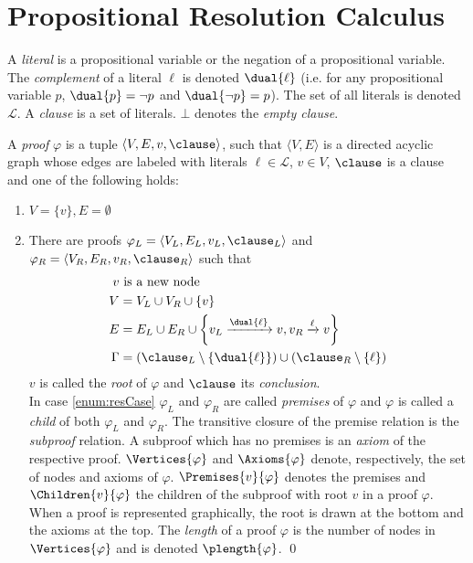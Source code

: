 \section{Propositional Resolution Calculus}
\label{sec:Resolution}

A \emph{literal} is a propositional variable or the negation of a propositional variable. The
\emph{complement} of a literal $\ell$ is denoted $\dual{\ell}$ (i.e. for any propositional variable $p$,
$\dual{p} = \neg p$ and $\dual{\neg p} = p$). The set of all literals is denoted $\mathcal{L}$. A
\emph{clause} is a set of literals. $\bot$ denotes the \emph{empty clause}.


\newcommand{\axiom}[1]{\widehat{#1}}
\newcommand{\n}{v}
\newcommand{\raiz}[1]{\rho(#1)}

\begin{definition}[Proof] 
\label{def:proof}
A \emph{proof} $\varphi$ is a tuple $\langle V,E,\n,\clause \rangle$, 
such that $\langle V,E \rangle$ is a directed acyclic graph whose edges are labeled with literals $\ell \in \mathcal{L}$, $\n \in V$, $\clause$ is a clause 
and one of the following holds:

\begin{enumerate}
	\item $V = \{\n\}, E = \emptyset$
	\item \label{enum:resCase} There are proofs $\varphi_L = \langle V_L, E_L, \n_L,\clause_L \rangle$ and $\varphi_R = \langle V_R, E_R, \n_R, \clause_R \rangle$ such that 
	    \begin{align*}
			\n & \text{ is a new node} \\
      V &= V_L \cup V_R \cup \{\n \} \\
      E &= E_L \cup E_R \cup
                    \left\{\n_L \xrightarrow{\dual{\ell}} \n , \n_R \xrightarrow{\ell} \n \right\} \\
     \Gamma &= \left( \clause_L \setminus \left\{ \dual{\ell} \right\} \right) \cup \left( \clause_R
                    \setminus \left\{ \ell \right\} \right)
    \end{align*}
		$\n$ is called the \emph{root} of $\varphi$ and $\clause$ its \emph{conclusion}.\\
		In case \ref{enum:resCase} $\varphi_L$ and $\varphi_R$ are called \emph{premises} of $\varphi$ and $\varphi$ is called a \emph{child} of both $\varphi_L$ and $\varphi_R$.
		The transitive closure of the premise relation is the \emph{subproof} relation. A subproof which
		has no premises is an \emph{axiom} of the respective proof.
		$\Vertices{\varphi}$ and $\Axioms{\varphi}$ denote, respectively, the set of nodes and axioms of $\varphi$. $\Premises{\n}{\varphi}$ denotes the premises and $\Children{\n}{\varphi}$ the children of the subproof with root $\n$ in a proof $\varphi$. When a proof is represented graphically, the root is drawn at the bottom and the axioms at the top. The \emph{length} of a proof $\varphi$ is the number of nodes in $\Vertices{\varphi}$ and is denoted $\plength{\varphi}$.
\qed
\end{enumerate}

\end{definition}

